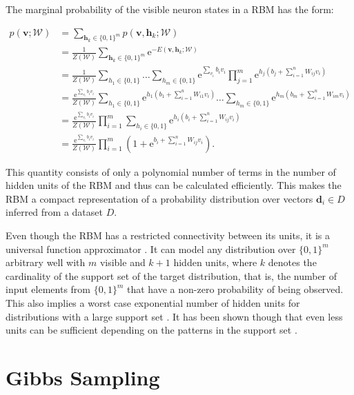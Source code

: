 The marginal probability of the visible neuron states in a RBM has the form:

\begin{align}
   p(\bm{v};\mathcal{W}) &= \sum_{\bm{h}_k \in \{0,1\}^m} p(\bm{v},\bm{h}_k;\mathcal{W})\\
   &= \frac{1}{Z(\mathcal{W})}\sum_{\bm{h}_k \in \{0,1\}^m} \mathrm{e}^{-E(\bm{v}, \bm{h}_k;\mathcal{W})}\\
   &= \frac{1}{Z(\mathcal{W})}\sum_{h_1\in \{0,1\}}\dots\sum_{h_m \in \{0,1\}}\mathrm{e}^{\sum_{v_i}b_iv_i}\prod_{j=1}^m\mathrm{e}^{h_j(b_j + \sum_{i=1}^nW_{ij}v_i)}\\
   &= \frac{\mathrm{e}^{\sum_{v_i}b_iv_i}}{Z(\mathcal{W})}\sum_{h_1 \in \{0,1\}}\mathrm{e}^{h_1(b_1 + \sum_{i=1}^nW_{i1}v_i)}\dots\sum_{h_m \in \{0,1\}}\mathrm{e}^{h_m(b_m + \sum_{i=1}^nW_{im}v_i)}\\
   &= \frac{\mathrm{e}^{\sum_{v_i}b_iv_i}}{Z(\mathcal{W})}\prod_{i=1}^m\sum_{h_i \in \{0,1\}}\mathrm{e}^{h_i(b_i + \sum_{i=1}^nW_{ij}v_i)}\\
   \label{eq:rbm}
   &= \frac{\mathrm{e}^{\sum_{v_i}b_iv_i}}{Z(\mathcal{W})}\prod_{i=1}^m(1+\mathrm{e}^{b_i + \sum_{i=1}^nW_{ij}v_i}).
\end{align}

This quantity consists of only a polynomial number of terms in the number of hidden units of the RBM and 
thus can be calculated efficiently. This makes the RBM a compact representation of a probability distribution 
over vectors $\bm{d}_i \in D$ inferred from a dataset $D$.

Even though the RBM has a restricted connectivity between its units, it is a universal function approximator \cite{le2008representational}.
It can model any distribution over $\{0,1\}^m$ arbitrary well with $m$ visible and $k+1$ hidden units, where 
$k$ denotes the cardinality of the support set of the target distribution, that is, the number of input elements
from $\{0,1\}^m$ that have a non-zero probability of being observed. This also implies a worst case 
exponential number of hidden units for distributions with a large support set \cite{le2008representational}. It has been shown though 
that even less units can be sufficient depending on the patterns in the support set \cite{montufar2011refinements}.

\section{Gibbs Sampling}
\label{sec:gibbsSampling}

